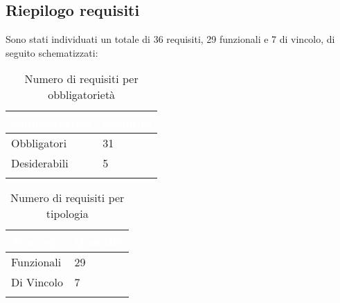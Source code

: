 \subsection{Riepilogo requisiti}
Sono stati individuati un totale di 36 requisiti, 29 funzionali e 7 di vincolo, di seguito schematizzati:
{
    \setlength{\freewidth}{\dimexpr\textwidth-10\tabcolsep}
    \renewcommand{\arraystretch}{1.5}
    \centering
    \setlength{\aboverulesep}{0pt}
    \setlength{\belowrulesep}{0pt}
    \begin{longtable}{C{.25\freewidth} C{.2\freewidth}} 
       \toprule
    \textcolor{white}{\textbf{Obbligatorietà}}&
    \textcolor{white}{\textbf{Quantità}}\\
    \toprule
    \endhead

    Obbligatori & 31\\
    Desiderabili & 5\\
    \bottomrule
    \caption{Numero di requisiti per obbligatorietà}
    \label{tab:requisiti-obbligatorieta}
    \end{longtable}
}

{
    \setlength{\freewidth}{\dimexpr\textwidth-10\tabcolsep}
    \renewcommand{\arraystretch}{1.5}
    \centering
    \setlength{\aboverulesep}{0pt}
    \setlength{\belowrulesep}{0pt}
    \begin{longtable}{C{.25\freewidth} C{.2\freewidth}} 
       \toprule
    \textcolor{white}{\textbf{Tipologia}}&
    \textcolor{white}{\textbf{Quantità}}\\
    \toprule
    \endhead

    Funzionali & 29\\
    Di Vincolo & 7\\
    \bottomrule
    \caption{Numero di requisiti per tipologia}
    \label{tab:requisiti-tipolgia}
    \end{longtable}
}



